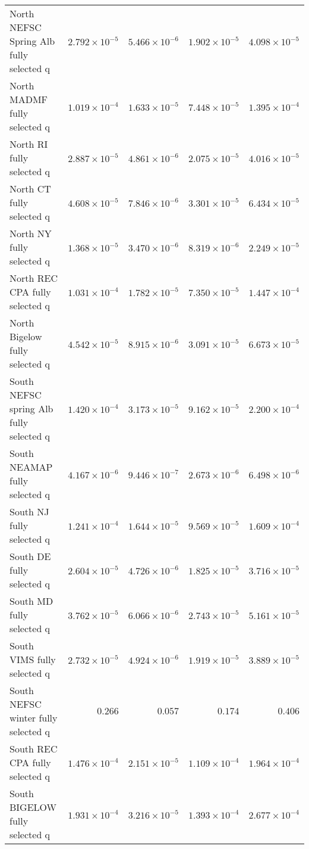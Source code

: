 \documentclass[
]{article}
\begin{document}
\begin{landscape}
\begin{longtable}[t]{lrrrr}
\addlinespace
North NEFSC Spring Alb fully selected q & $2.792\times 10^{-5}$ & $5.466\times 10^{-6}$ & $1.902\times 10^{-5}$ & $4.098\times 10^{-5}$\\
North MADMF fully selected q & $1.019\times 10^{-4}$ & $1.633\times 10^{-5}$ & $7.448\times 10^{-5}$ & $1.395\times 10^{-4}$\\
North RI fully selected q & $2.887\times 10^{-5}$ & $4.861\times 10^{-6}$ & $2.075\times 10^{-5}$ & $4.016\times 10^{-5}$\\
North CT fully selected q & $4.608\times 10^{-5}$ & $7.846\times 10^{-6}$ & $3.301\times 10^{-5}$ & $6.434\times 10^{-5}$\\
North NY fully selected q & $1.368\times 10^{-5}$ & $3.470\times 10^{-6}$ & $8.319\times 10^{-6}$ & $2.249\times 10^{-5}$\\
\addlinespace
North REC CPA fully selected q & $1.031\times 10^{-4}$ & $1.782\times 10^{-5}$ & $7.350\times 10^{-5}$ & $1.447\times 10^{-4}$\\
North Bigelow fully selected q & $4.542\times 10^{-5}$ & $8.915\times 10^{-6}$ & $3.091\times 10^{-5}$ & $6.673\times 10^{-5}$\\
South NEFSC spring Alb fully selected q & $1.420\times 10^{-4}$ & $3.173\times 10^{-5}$ & $9.162\times 10^{-5}$ & $2.200\times 10^{-4}$\\
South NEAMAP fully selected q & $4.167\times 10^{-6}$ & $9.446\times 10^{-7}$ & $2.673\times 10^{-6}$ & $6.498\times 10^{-6}$\\
South NJ fully selected q & $1.241\times 10^{-4}$ & $1.644\times 10^{-5}$ & $9.569\times 10^{-5}$ & $1.609\times 10^{-4}$\\
\addlinespace
South DE fully selected q & $2.604\times 10^{-5}$ & $4.726\times 10^{-6}$ & $1.825\times 10^{-5}$ & $3.716\times 10^{-5}$\\
South MD fully selected q & $3.762\times 10^{-5}$ & $6.066\times 10^{-6}$ & $2.743\times 10^{-5}$ & $5.161\times 10^{-5}$\\
South VIMS fully selected q & $2.732\times 10^{-5}$ & $4.924\times 10^{-6}$ & $1.919\times 10^{-5}$ & $3.889\times 10^{-5}$\\
South NEFSC winter fully selected q & $0.266$ & $0.057$ & $0.174$ & $0.406$\\
South REC CPA fully selected q & $1.476\times 10^{-4}$ & $2.151\times 10^{-5}$ & $1.109\times 10^{-4}$ & $1.964\times 10^{-4}$\\
\addlinespace
South BIGELOW fully selected q & $1.931\times 10^{-4}$ & $3.216\times 10^{-5}$ & $1.393\times 10^{-4}$ & $2.677\times 10^{-4}$\\

\end{longtable}
\end{landscape}
\end{document}
